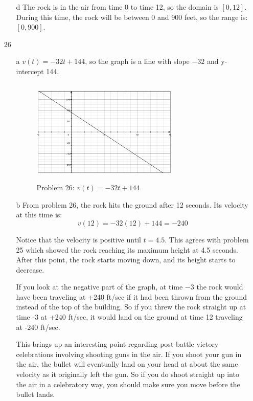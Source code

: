 \documentclass[fleqn,addpoints]{exam}
\begin{document}
\begin{itemize}
\begin{itemize}
\item[d]
The rock is in the air from time 0 to time 12, so the domain is $[0, 12]$.  During this time, the rock will be between 0
and 900 feet, so the range is: $[0, 900]$.

\end{itemize}

\pagebreak

\item[26]
\begin{itemize}
\item[a]
$v(t) = -32t + 144$, so the graph is a line with slope $-32$ and y-intercept 144.

\begin{figure}[H]
  \centering
  \includegraphics[width=7cm,height=5cm]{p65-26.eps}
  \caption*{Problem 26: $v(t) = -32t + 144$}
\end{figure}

\item[b]
From problem 26, the rock hits the ground after 12 seconds.  Its velocity at this time is:
\[
  v(12) = -32(12) + 144 = -240
\]

Notice that the velocity is positive until $t=4.5$.  This agrees with problem 25 which showed the rock reaching its
maximum height at 4.5 seconds.  After this point, the rock starts moving down, and its height starts to decrease.

If you look at the negative part of the graph, at time $-3$ the rock would have been traveling at +240 ft/sec if it
had been thrown from the ground instead of the top of the building.  So if you threw the rock straight up at time -3 at
+240 ft/sec, it would land on the ground at time 12 traveling at -240 ft/sec.

This brings up an interesting point regarding post-battle victory celebrations involving shooting guns in the air.  If
you shoot your gun in the air, the bullet will eventually land on your head at about the same velocity as it originally
left the gun.  So if you do shoot straight up into the air in a celebratory way, you should make sure you move before
the bullet lands.


\end{itemize}
\end{itemize}
\end{document}
